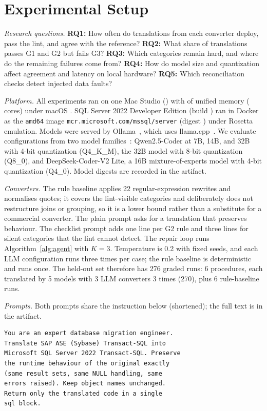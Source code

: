 \section{Experimental Setup}\label{sec:setup}

\textit{Research questions.}
\textbf{RQ1:} How often do translations from each converter deploy, pass the lint, and agree with the
reference?
\textbf{RQ2:} What share of translations passes G1 and G2 but fails G3?
\textbf{RQ3:} Which categories remain hard, and where do the remaining failures come from?
\textbf{RQ4:} How do model size and quantization affect agreement and latency on local hardware?
\textbf{RQ5:} Which reconciliation checks detect injected data faults?

\textit{Platform.} All experiments ran on one Mac Studio (\HwChip) with \HwMemory{} of unified memory
(\HwCores{} cores) under macOS \HwMacOS. SQL Server 2022 Developer Edition (build \SqlBuild) ran in Docker
\DockerVersion{} as the \texttt{amd64} image \texttt{mcr.microsoft.com/mssql/server} (digest \texttt{\ImageDigest}) under
Rosetta emulation. Models were served by Ollama~\cite{ollama}, which
uses llama.cpp~\cite{llamacpp}. We evaluate \NumModels{} configurations from two model
families~\cite{hui2024qwen,deepseek2024v2}: Qwen2.5-Coder at 7B, 14B, and 32B with 4-bit quantization
(Q4\_K\_M), the 32B model with 8-bit quantization (Q8\_0), and DeepSeek-Coder-V2 Lite, a 16B
mixture-of-experts model with 4-bit quantization (Q4\_0). Model digests are recorded in the artifact.

\textit{Converters.} The rule baseline applies 22 regular-expression rewrites and normalises quotes; it
covers the lint-visible categories and deliberately does not restructure joins or grouping, so it is a
lower bound rather than a substitute for a commercial converter. The plain prompt asks for a translation
that preserves behaviour. The checklist prompt adds one line per G2 rule and three lines for silent
categories that the lint cannot detect. The repair loop runs Algorithm~\ref{alg:agent} with $K=3$.
Temperature is 0.2 with fixed seeds, and each LLM configuration runs three times per case; the rule baseline
is deterministic and runs once. The held-out set therefore has 276 graded runs: 6 procedures, each
translated by 5 models with 3 LLM converters 3 times (270), plus 6 rule-baseline runs.

\textit{Prompts.} Both prompts share the instruction below (shortened); the full text is in the artifact.
\begin{lstlisting}
You are an expert database migration engineer.
Translate SAP ASE (Sybase) Transact-SQL into
Microsoft SQL Server 2022 Transact-SQL. Preserve
the runtime behaviour of the original exactly
(same result sets, same NULL handling, same
errors raised). Keep object names unchanged.
Return only the translated code in a single
sql block.
\end{lstlisting}

